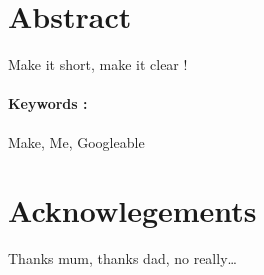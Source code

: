 \vfill

\cleardoublepage
\pagestyle{headings}
%
\clearpage
\section*{Abstract}
Make it short, make it clear !
\blindtext
\paragraph{Keywords :} Make, Me, Googleable
\clearpage
\section*{Acknowlegements}
Thanks mum, thanks dad, no really… 
\blindtext

\cleardoublepage
{}
\cftnodots
\renewcommand{\cftsubsectionfont}{\small}
\tableofcontents

